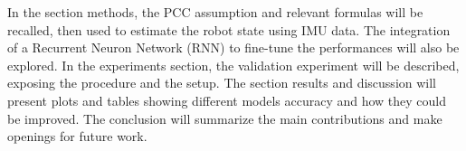 In the section methods, the PCC assumption and relevant formulas will be recalled, then used to estimate the robot state using IMU data. The integration of a Recurrent Neuron Network (RNN) to fine-tune the performances will also be explored. In the experiments section, the validation experiment will be described, exposing the procedure and the setup. The section results and discussion will present plots and tables showing different models accuracy and how they could be improved. The conclusion will summarize the main contributions and make openings for future work.



